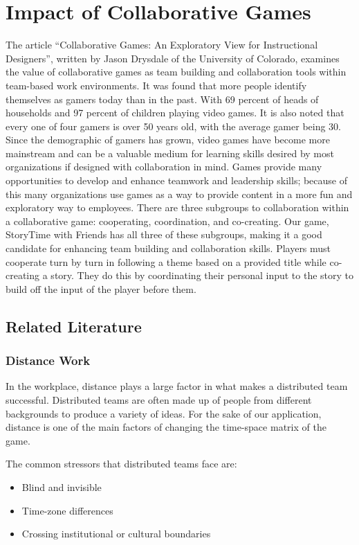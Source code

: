 \documentclass{sigchi}
\begin{document}
\section{Impact of Collaborative Games}
The article ``Collaborative Games: An Exploratory View for Instructional Designers'', written by Jason Drysdale of the University of Colorado, examines the value of collaborative games as team building and collaboration tools within team-based work environments.\cite{drysdale2011collaborative} It was found that more people identify themselves as gamers today than in the past. With 69 percent of heads of households and 97 percent of children playing video games. It is also noted that every one of four gamers is over 50 years old, with the average gamer being 30. Since the demographic of gamers has grown, video games have become more mainstream and can be a valuable medium for learning skills desired by most organizations if designed with collaboration in mind. Games provide many opportunities to develop and enhance teamwork and leadership skills; because of this many organizations use games as a way to provide content in a more fun and exploratory way to employees. There are three subgroups to collaboration within a collaborative game: cooperating, coordination, and co-creating. Our game, StoryTime with Friends has all three of these subgroups, making it a good candidate for enhancing team building and collaboration skills. Players must cooperate turn by turn in following a theme based on a provided title while co-creating a story. They do this by coordinating their personal input to the story to build off the input of the player before them.

\subsection{Related Literature}

\subsubsection{Distance Work}
In the workplace, distance plays a large factor in what makes a distributed team successful. Distributed teams are often made up of people from different backgrounds to produce a variety of ideas. \cite{distance} For the sake of our application, distance is one of the main factors of changing the time-space matrix of the game.

The common stressors that distributed teams face are:
\begin{itemize}[leftmargin=.5in, noitemsep]
\item Blind and invisible
\item Time-zone differences
\item Crossing institutional or cultural boundaries
\end{itemize}
\end{document}

